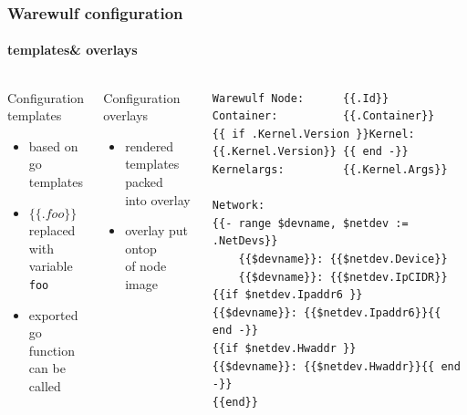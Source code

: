 \documentclass[aspectratio=169]{beamer}
\begin{document}
\begin{frame}[fragile]
\frametitle{Warewulf configuration}
\framesubtitle{templates\& overlays}
\begin{columns}
\begin{block}{Configuration templates}
  \begin{itemize}
    \item based on go templates
    \item $\{\{ .foo \}\}$ replaced \\
    with variable \texttt{foo}
    \item exported go function \\
    can be called
  \end{itemize}
\end{block}
\begin{block}{Configuration overlays}
\begin{itemize}
  \item rendered templates packed\\
  into overlay
  \item overlay put ontop \\
  of node image
\end{itemize}
\end{block}
\begin{lstlisting}[style=ww,caption=issue.ww]
Warewulf Node:      {{.Id}}
Container:          {{.Container}}
{{ if .Kernel.Version }}Kernel:             {{.Kernel.Version}} {{ end -}}
Kernelargs:         {{.Kernel.Args}}

Network:
{{- range $devname, $netdev := .NetDevs}}
    {{$devname}}: {{$netdev.Device}}
    {{$devname}}: {{$netdev.IpCIDR}}
{{if $netdev.Ipaddr6 }}    {{$devname}}: {{$netdev.Ipaddr6}}{{ end -}}
{{if $netdev.Hwaddr }}    {{$devname}}: {{$netdev.Hwaddr}}{{ end -}}
{{end}}
\end{lstlisting}
\end{columns}
\end{frame}
\end{document}
